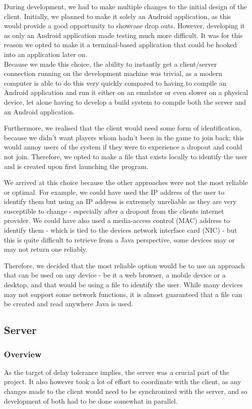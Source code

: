 \documentclass[11pt]{article}
\begin{document}
During development, we had to make multiple changes to the initial design of the client. Initially, we planned to make it solely an Android application, as this would provide a good opportunity to showcase drop outs. However, developing it as only an Android application made testing much more difficult. It was for this reason we opted to make it a terminal-based application that could be hooked into an application later on. \\

Because we made this choice, the ability to instantly get a client/server connection running on the development machine was trivial, as a modern computer is able to do this very quickly compared to having to compile an Android application and run it either on an emulator or even slower on a physical device, let alone having to develop a build system to compile both the server and an Android application.

Furthermore, we realised that the client would need some form of identification, because we didn't want players whom hadn't been in the game to join back; this would annoy users of the system if they were to experience a dropout and could not join. Therefore, we opted to make a file that exists locally to identify the user and is created upon first launching the program. 

We arrived at this choice because the other approaches were not the most reliable or optimal. For example, we could have used the IP address of the user to identify them but using an IP address is extremely unreliable as they are very susceptible to change - especially after a dropout from the clients internet provider. We could have also used a media-access control (MAC) address to identify them - which is tied to the devices network interface card (NIC) - but this is quite difficult to retrieve from a Java perspective, some devices may or may not return one reliably.

Therefore, we decided that the most reliable option would be to use an approach that can be used on any device - be it a web browser, a mobile device or a desktop, and that would be using a file to identify the user. While many devices may not support some network functions, it is almost guaranteed that a file can be created and read anywhere Java is used. 

\subsection{Server}
\subsubsection{Overview}
As the target of delay tolerance implies, the server was a crucial part of the project. It also however took a lot of effort to coordinate with the client, as any changes made to the client would need to be synchronized with the server, and so development of both had to be done somewhat in parallel. 
\end{document}

